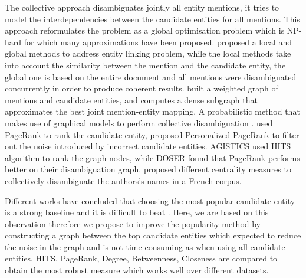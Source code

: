 \documentclass{llncs}
\begin{document}
  The collective approach disambiguates jointly all entity mentions, it tries to model the interdependencies between the candidate entities for all mentions. This approach reformulates the problem as a global optimisation problem which is NP-hard for which many approximations have been proposed.
\cite{ratinov_local_2011} proposed a local and global methods to address entity linking problem, while the local methods take into account the similarity between the mention and the candidate entity, the global one is based on the entire document and all mentions were disambiguated concurrently in order to produce coherent results.
  \cite{hoffart_robust_2011} built a weighted graph of mentions and candidate entities, and computes a dense subgraph that approximates the best joint mention-entity mapping. 
  A probabilistic method that makes use of graphical models to perform collective disambiguation  \cite{ganea_probabilistic_2016}.
\cite{alhelbawy_graph_2014} used PageRank to rank the candidate entity,  \cite{pershina_personalized_2015} proposed Personalized PageRank to filter out the noise introduced by incorrect candidate entities.
  AGISTICS \cite{usbeck_agdistis_2014} used HITS algorithm to rank the graph nodes, while DOSER \cite{zwicklbauer_doser_2016} found that PageRank performs better on their disambiguation graph.  \cite{brando_reden:_2016} proposed different centrality measures to collectively disambiguate the authors's names in a French corpus.

Different works have concluded that choosing the most popular candidate entity is a strong baseline and it is difficult to beat \cite{hachey_evaluating_2013,cheng_relational_2013}. Here, we are based on this observation therefore we propose to improve the popularity method by constructing a graph between the top candidate entities which  expected to reduce the noise in the graph and is not  time-consuming as when using all candidate entities. HITS, PageRank, Degree, Betweenness, Closeness are compared to obtain the most robust measure which works well over different datasets.

 
\end{document}
